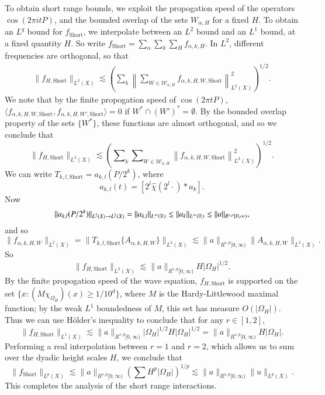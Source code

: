 To obtain short range bounds, we exploit the propogation speed of the operators $\cos(2 \pi i t P)$, and the bounded overlap of the sets $W_{\alpha,H}$ for a fixed $H$. To obtain an $L^q$ bound for $f_{\text{Short}}$, we interpolate between an $L^2$ bound and an $L^1$ bound, at a fixed quantity $H$. So write $f_{\text{Short}} = \sum_\alpha \sum_k \sum_H f_{\alpha,k,H}$.
%
In $L^2$, different frequencies are orthogonal, so that
%
\begin{align*}
    \| f_{H,\text{Short}} \|_{L^2(X)} \lesssim \left( \sum\nolimits_k \left\| \sum\nolimits_{W \in \mathcal{W}_{\alpha,H}} f_{\alpha,k,H,W,\text{Short}} \right\|_{L^2(X)}^2 \right)^{1/2}.
\end{align*}
%
We note that by the finite propogation speed of $\cos(2 \pi t P)$, $\langle f_{\alpha,k,H,W,\text{Short}}, f_{\alpha,k,H,W',\text{Short}} \rangle = 0$ if $W^* \cap (W')^* = \emptyset$. By the bounded overlap property of the sets $\{ W^* \}$, these functions are almost orthogonal, and so we conclude that
%
\[ \| f_{H,\text{Short}} \|_{L^2(X)} \lesssim \left( \sum\nolimits_k \sum\nolimits_{W \in \mathcal{W}_{\alpha,H}} \left\| f_{\alpha,k,H,W,\text{Short}} \right\|_{L^2(X)}^2 \right)^{1/2}. \]
%
We can write $T_{k,l,\text{Short}} = a_{k,l}(P / 2^k)$, where
%
\[ a_{k,l}(t) = [2^l \widehat{\chi}(2^l \cdot) * a_k]. \]
%
Now
%
\[ \| a_{k,l}(P/2^k) \|_{L^2(X) \to L^2(X)} = \| a_{k,l} \|_{L^\infty(\operatorname{\mathbb{R}})} \lesssim \| a_k \|_{L^\infty(\operatorname{\mathbb{R}})} \lesssim \| a \|_{R^{s,p}[0,\infty)}, \]
%
and so
%
\[ \| f_{\alpha,k,H,W} \|_{L^2(X)} = \| T_{k,l,\text{Short}} \{ A_{\alpha,k,H,W} \} \|_{L^2(X)} \lesssim \| a \|_{R^{s,p}[0,\infty)} \| A_{\alpha,k,H,W} \|_{L^2(X)}. \]
%
So
%
\[ \| f_{H,\text{Short}} \|_{L^2(X)} \lesssim \| a \|_{R^{s,p}[0,\infty)} H |\Omega_H|^{1/2}. \]
%
By the finite propogation speed of the wave equation, $f_{H,\text{Short}}$ is supported on the set $\{ x: (M \chi_{\Omega_H})(x) \geq 1/10^d \}$, where $M$ is the Hardy-Littlewood maximal function; by the weak $L^1$ boundedness of $M$, this set has measure $O(|\Omega_H|)$. Thus we can use H\"{o}lder's inequality to conclude that for any $r \in [1,2]$,
%
\[ \| f_{H,\text{Short}} \|_{L^1(X)} \lesssim \| a \|_{R^{s,p}[0,\infty)} |\Omega_H|^{1/2} H |\Omega_H|^{1/2} = \| a \|_{R^{s,p}[0,\infty)} H |\Omega_H|. \]
%
Performing a real interpolation between $r = 1$ and $r = 2$, which allows us to sum over the dyadic height scales $H$, we conclude that
%
\[ \| f_{\text{Short}} \|_{L^p(X)} \lesssim  \| a \|_{R^{s,p}[0,\infty)} \left( \sum H^p |\Omega_H| \right)^{1/p} \lesssim \| a \|_{R^{s,p}[0,\infty)} \| u \|_{L^p(X)}. \]
%
This completes the analysis of the short range interactions.


